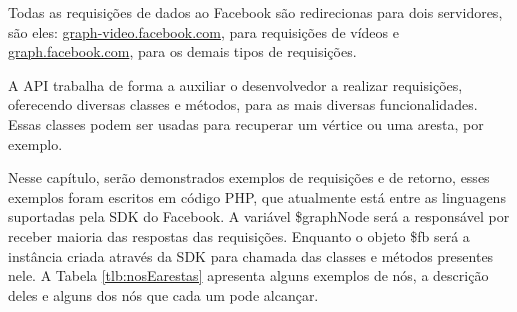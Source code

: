 Todas as requisições de dados ao Facebook são redirecionas para dois servidores, são eles: \url{graph-video.facebook.com}, para requisições de vídeos e \url{graph.facebook.com}, para os demais tipos de requisições.

A API trabalha de forma a auxiliar o desenvolvedor a realizar requisições, oferecendo diversas classes e métodos, para as mais diversas funcionalidades. Essas classes podem ser usadas para recuperar um vértice ou uma aresta, por exemplo.

Nesse capítulo, serão demonstrados exemplos de requisições e de retorno, esses exemplos foram escritos em código PHP, que atualmente está entre as linguagens suportadas pela SDK do Facebook. A variável \$graphNode será a responsável por receber maioria das respostas das requisições. Enquanto o objeto \$fb será a instância criada através da SDK para chamada das classes e métodos presentes nele. A Tabela \ref{tlb:nosEarestas} apresenta alguns exemplos de nós, a descrição deles e alguns dos nós que cada um pode alcançar.

